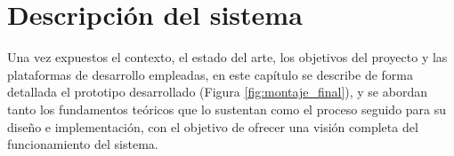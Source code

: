 \chapter{Descripción del sistema}
\label{cap:capitulo5}



Una vez expuestos el contexto, el estado del arte, los objetivos del proyecto y las plataformas de desarrollo empleadas, en este capítulo se describe de forma detallada el prototipo desarrollado (Figura \ref{fig:montaje_final}), y se abordan tanto los fundamentos teóricos que lo sustentan como el proceso seguido para su diseño e implementación, con el objetivo de ofrecer una visión completa del funcionamiento del sistema.

